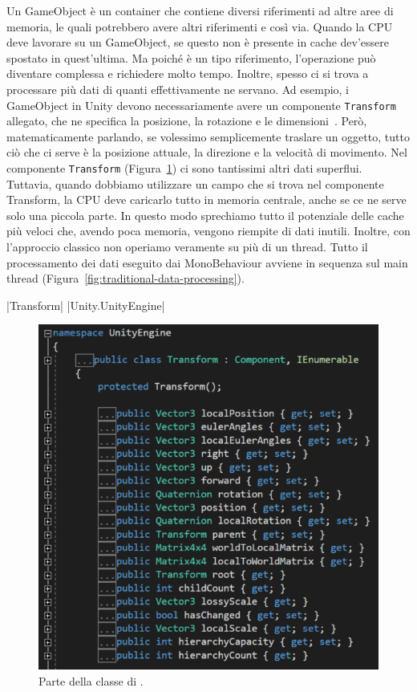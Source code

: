 Un GameObject è un container che contiene diversi riferimenti ad altre aree di memoria, le quali potrebbero avere altri riferimenti e così via. Quando la CPU deve lavorare su un GameObject, se questo non è presente in cache dev'essere spostato in quest'ultima. Ma poiché è un tipo riferimento, l'operazione può diventare complessa e richiedere molto tempo. Inoltre, spesso ci si trova a processare più dati di quanti effettivamente ne servano.
Ad esempio, i GameObject in Unity devono necessariamente avere un componente \verb|Transform| allegato, che ne specifica la posizione, la rotazione e le dimensioni~\cite{doc:unity-transforms}. Però, matematicamente parlando, se volessimo semplicemente traslare un oggetto, tutto ciò che ci serve è la posizione attuale, la direzione e la velocità di movimento. Nel componente \verb|Transform| (Figura~\ref{fig:transform-class}) ci sono tantissimi altri dati superflui. Tuttavia, quando dobbiamo utilizzare un campo che si trova nel componente Transform, la CPU deve caricarlo tutto in memoria centrale, anche se ce ne serve solo una piccola parte. In questo modo sprechiamo tutto il potenziale delle cache più veloci che, avendo poca memoria, vengono riempite di dati inutili. Inoltre, con l'approccio classico non operiamo veramente su più di un thread. Tutto il processamento dei dati eseguito dai MonoBehaviour avviene in sequenza sul main thread (Figura~\ref{fig:traditional-data-processing}).

|Transform|
|Unity.UnityEngine|

\begin{figure}[!ht]
    \centering
    \includegraphics[width=0.64\columnwidth]{gfx/imgs/chapter1/TransformClassUnityEngine.png}
    \caption{Parte della classe \protect {} di \protect {}.}
    \label{fig:transform-class}
\end{figure}


